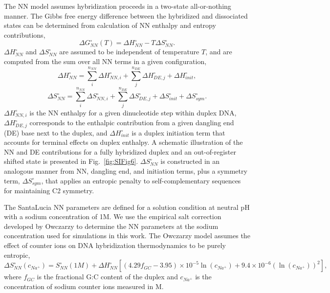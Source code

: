 \documentclass[journal=jpcbfk,manuscript=article]{achemso}
\begin{document}
The NN model assumes hybridization proceeds in a two-state all-or-nothing manner. The Gibbs free energy difference between the hybridized and dissociated states can be determined from calculation of NN enthalpy and entropy contributions,
\begin{equation}\label{SIe1}
\Delta G_{NN}^{\circ}(T) = \Delta H_{NN}^{\circ} - T\Delta S_{NN}^{\circ}.
\end{equation}
$\Delta H_{NN}^{\circ}$ and $\Delta S_{NN}^{\circ}$ are assumed to be independent of temperature $T$, and are computed from the sum over all NN terms in a given configuration,
\begin{equation}\label{SIe2}
\Delta H_{NN}^{\circ} = \sum_{i}^{n_{NN}}\Delta H_{NN, i}^{\circ} + \sum_{j}^{n_{DE}}\Delta H_{DE, j}^{\circ} + \Delta H_{init}^{\circ},
\end{equation}
\begin{equation}\label{SIe3}
\Delta S_{NN}^{\circ} = \sum_{i}^{n_{NN}}\Delta S_{NN, i}^{\circ} + \sum_{j}^{n_{DE}}\Delta S_{DE, j}^{\circ} + \Delta S_{init}^{\circ} + \Delta S_{sym}^{\circ}.
\end{equation}                          
$\Delta H_{NN, i}^{\circ}$ is the NN enthalpy for a given dinucleotide step within duplex DNA, $\Delta H_{DE, j}^{\circ}$ corresponds to the enthalpic contribution from a given dangling end (DE) base next to the duplex\citep{Santalucia2004TM}, and $\Delta H_{init}^{\circ}$ is a duplex initiation term that accounts for terminal effects on duplex enthalpy. A schematic illustration of the NN and DE contributions for a fully hybridized duplex and an out-of-register shifted state is presented in Fig.~\ref{fig:SIFig6}. $\Delta S_{NN}^{\circ}$ is constructed in an analogous manner from NN, dangling end, and initiation terms, plus a symmetry term, $\Delta S_{sym}^{\circ}$, that applies an entropic penalty to self-complementary sequences for maintaining C2 symmetry. 

The SantaLucia NN parameters are defined for a solution condition at neutral pH with a sodium concentration of 1M. We use the empirical salt correction developed by Owczarzy\citep{Owczarzy2008PredictingCations} to determine the NN parameters at the sodium concentration used for simulations in this work. The Owczarzy model assumes the effect of counter ions on DNA hybridization thermodynamics to be purely entropic,
\begin{equation}\label{SIe4}
\Delta S_{NN}^{\circ}(c_{Na^+}) = S_{NN}^{\circ}(1M) + \Delta H_{NN}^{\circ}[(4.29f_{GC}-3.95)\times 10^{-5} \ln{(c_{Na^+})}+ 9.4\times 10^{-6} (\ln{(c_{Na^+})})^2],
\end{equation} 
where $f_{GC}$ is the fractional G:C content of the duplex and $c_{Na^+}$ is the concentration of sodium counter ions measured in M.  
\end{document}
